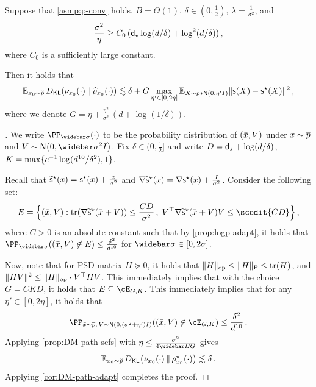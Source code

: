 \begin{corollary}\label{cor:DM-path-adapt}
Suppose that \cref{asmp:p-conv} holds, $B=\Theta(1)$, $\delta\in(0,\frac12)$, $\lambda=\frac{1}{\sigma^2}$, and
\begin{align*}
    \frac{\sigma^2}{\eta}\ge C_0\,\prn[big]{ \dstar\log(d/\delta)+\log^2(d/\delta)}\,,
\end{align*}
where $C_0$ is a sufficiently large constant. 

Then it holds that 
\begin{align*}
\En_{\xz\sim \breve p} \Dkl{\piz{\cdot}}{\rhohz{\cdot}}
\leqsim \delta+G\max_{\eta'\in[0,2\eta]}\En_{X\sim p*\normal{0,\eta'\Id}}\nrm{\scf(X)-\scfs(X)}^2\,,
\end{align*}
where we denote $G=\eta+\frac{\eta^2}{\sigma^2}\,(d+\log(1/\delta))$.
\end{corollary}
\begin{proof}[]
We write $\PP_{\sigbar}(\cdot)$ to be the probability distribution of $(\bar{x},V)$ under $\bar{x}\sim \overline{p}$ and $V\sim \normal{0,\sigbar^2\Id}$. 
Fix $\delta\in(0,\frac12]$ and write $D=\mathsf{d}_\star+\log(d/\delta)$, $K=\max\{c^{-1}\log(d^{10}/\delta^2),1\}$. 

Recall that $\widetilde{\mathsf{s}}^\star(x)=\mathsf{s}^\star(x)+\frac{x}{\sigma^2}$ and $\nabla \widetilde{\mathsf{s}}^\star(x)=\nabla \mathsf{s}^\star(x)+\frac{I}{\sigma^2}$. Consider the following set:
\begin{align*}
    E=\crl[\Big]{(\xbar,V): \tr(\nabla \tscfs(\xbar+V))\leq \frac{CD}{\sigma^2}\,,\; V\tp\nabla \tscfs(\xbar+V)V\leq \scedit{CD}}\,,
\end{align*}
where $C>0$ is an absolute constant such that by \cref{prop:logp-adapt}, it holds that $\PP_{\sigbar}((\xbar,V)\not\in E)\leq \frac{\delta^2}{d^{10}}$ for $\sigbar\in[0,2\sigma]$. 

Now, note that for PSD matrix $H\succeq 0$, it holds that $\lVert H\|_{\mathrm{op}}\leq \lVert H\rVert_{\mathrm{F}}\leq \mathrm{tr}(H)$, and $\lVert HV\rVert^2\leq \lVert H\|_{\mathrm{op}}\cdot V^\top HV$. This immediately implies that with the choice $G=CKD$, it holds that $E\subseteq \cE_{G,K}$. This immediately implies that for any $\eta'\in[0,2\eta]$, it holds that 
\begin{align*}
    \PP_{\xbar\sim \pbar,\, V\sim \normal{0,(\sigma^2+\eta')\Id}}\prn*{(\xbar,V)\not\in \cE_{G,K}}\leq \frac{\delta^2}{d^{10}}\,.
\end{align*}
Applying \cref{prop:DM-path-scfs} with $\eta\leq \frac{\sigma^2}{4\Bbar G}$ gives
\begin{align*}
\En_{\xz\sim \breve p} \Dkl{\piz{\cdot}}{\rhosz{\cdot}}
\leqsim\delta\,.
\end{align*}
Applying \cref{cor:DM-path-adapt} completes the proof.
\end{proof}

